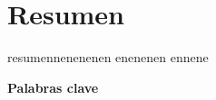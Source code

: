 

\section{Resumen} 

resumennenenenen enenenen ennene 
	\begin{large}
		
		\textbf{Palabras clave} \\
	\end{large}

